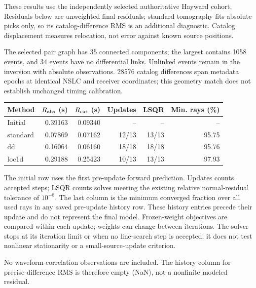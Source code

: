 These results use the independently selected authoritative Hayward cohort. Residuals below are unweighted final residuals; standard tomography fits absolute picks only, so its catalog-difference RMS is an additional diagnostic. Catalog displacement measures relocation, not error against known source positions.

The selected pair graph has 35 connected components; the largest contains 1058 events, and 34 events have no differential links. Unlinked events remain in the inversion with absolute observations. 28576 catalog differences span metadata epochs at identical NSLC and receiver coordinates; this geometry match does not establish unchanged timing calibration.

\begin{center}\begin{tabular}{lrrrrr}\toprule Method & $R_{\rm abs}$ (s) & $R_{\rm cat}$ (s) & Updates & LSQR & Min. rays (\%)\\\midrule
Initial & 0.39163 & 0.09340 & -- & -- & --\\
standard & 0.07869 & 0.07162 & 12/13 & 13/13 & 95.75\\
dd & 0.16064 & 0.06160 & 18/18 & 18/18 & 95.76\\
loc1d & 0.29188 & 0.25423 & 10/13 & 13/13 & 97.93\\
\bottomrule\end{tabular}\end{center}
The initial row uses the first pre-update forward prediction. Updates counts accepted steps; LSQR counts solves meeting the existing relative normal-residual tolerance of $10^{-8}$. The last column is the minimum converged fraction over all used rays in any saved pre-update history row. These history entries precede their update and do not represent the final model. Frozen-weight objectives are compared within each update; weights can change between iterations. The solver stops at its iteration limit or when no line-search step is accepted; it does not test nonlinear stationarity or a small-source-update criterion.

No waveform-correlation observations are included. The history column for precise-difference RMS is therefore empty (NaN), not a nonfinite modeled residual.

